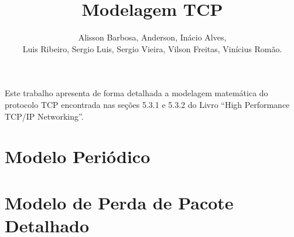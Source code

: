 \documentclass[12pt]{article}
\title{Modelagem TCP}
\author{Alisson Barbosa, Anderson, Inácio Alves, \\ 
  Luis Ribeiro, Sergio Luis, Sergio Vieira, Vilson Freitas, 
  Vinícius Romão.}
\begin{document}
 

\maketitle

     
\begin{resumo} 
  Este trabalho apresenta de forma detalhada a modelagem matemática do protocolo
  TCP encontrada nas seções 5.3.1 e 5.3.2 do Livro ``High Performance TCP/IP Networking''.
\end{resumo}


\section{Modelo Periódico}



\section{Modelo de Perda de Pacote Detalhado}



\end{document}
